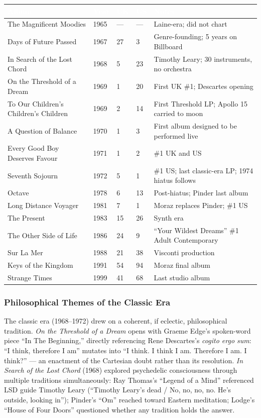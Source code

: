 \documentclass[11pt,letterpaper]{article}
\newcommand{\tableheader}[1]{\textbf{\sffamily\textcolor{white}{#1}}}
\begin{document}
\begin{center}
\begin{tabularx}{\textwidth}{L{4.5cm}C{1.2cm}C{1.2cm}C{1.2cm}X}
\toprule
{}
\tableheader{Album} & \tableheader{Year} & \tableheader{UK} & \tableheader{US} & \tableheader{Notes} \\
\midrule
The Magnificent Moodies & 1965 & --- & --- & Laine-era; did not chart \\
Days of Future Passed & 1967 & 27 & 3 & Genre-founding; 5 years on Billboard \\
In Search of the Lost Chord & 1968 & 5 & 23 & Timothy Leary; 30 instruments, no orchestra \\
On the Threshold of a Dream & 1969 & 1 & 20 & First UK \#1; Descartes opening \\
To Our Children's Children's Children & 1969 & 2 & 14 & First Threshold LP; Apollo 15 carried to moon \\
A Question of Balance & 1970 & 1 & 3 & First album designed to be performed live \\
Every Good Boy Deserves Favour & 1971 & 1 & 2 & \#1 UK and US \\
Seventh Sojourn & 1972 & 5 & 1 & \#1 US; last classic-era LP; 1974 hiatus follows \\
Octave & 1978 & 6 & 13 & Post-hiatus; Pinder last album \\
Long Distance Voyager & 1981 & 7 & 1 & Moraz replaces Pinder; \#1 US \\
The Present & 1983 & 15 & 26 & Synth era \\
The Other Side of Life & 1986 & 24 & 9 & ``Your Wildest Dreams'' \#1 Adult Contemporary \\
Sur La Mer & 1988 & 21 & 38 & Visconti production \\
Keys of the Kingdom & 1991 & 54 & 94 & Moraz final album \\
Strange Times & 1999 & 41 & 68 & Last studio album \\
\bottomrule
\end{tabularx}
\end{center}

\subsubsection{Philosophical Themes of the Classic Era}

The classic era (1968--1972) drew on a coherent, if eclectic, philosophical tradition. \textit{On the Threshold of a Dream} opens with Graeme Edge's spoken-word piece ``In The Beginning,'' directly referencing Rene Descartes's \textit{cogito ergo sum}: ``I think, therefore I am'' mutates into ``I think. I think I am. Therefore I am. I think?'' --- an enactment of the Cartesian doubt rather than its resolution. \textit{In Search of the Lost Chord} (1968) explored psychedelic consciousness through multiple traditions simultaneously: Ray Thomas's ``Legend of a Mind'' referenced LSD guide Timothy Leary (``Timothy Leary's dead / No, no, no, no. He's outside, looking in''); Pinder's ``Om'' reached toward Eastern meditation; Lodge's ``House of Four Doors'' questioned whether any tradition holds the answer.
\end{document}
